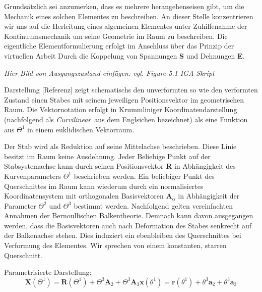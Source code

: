 \documentclass[german,a4paper,12pt,oneside]{scrbook}
\theoremstyle{definition}
\theoremstyle{definition}
\theoremstyle{definition}
\theoremstyle{definition}
\theoremstyle{definition}
\theoremstyle{definition}
\begin{document}
Grundsätzlich sei anzumerken, dass es  mehrere herangehenseisen gibt, um die Mechanik eines solchen Elementes zu beschreiben. An dieser Stelle konzentrieren wir uns auf die Herleitung eines algemeinen Elementes unter Zuhilfenahme der Kontinuumsmechanik um seine Geometrie im Raum zu beschreiben. Die eigentliche Elementformulierung erfolgt im Anschluss über das Prinzip der virtuellen Arbeit Durch die Koppelung von Spannungen \textbf{S} und Dehnungen \textbf{E}. 

\LARGE %
\emph{Hier Bild von Ausgangszustand einfügen: vgl. Figure 5.1 IGA Skript}

\normalsize
Darstellung [Referenz] zeigt schematischs den unverformten so wie den verformten Zustand einen Stabes mit seinem jeweiligen Positionsvektor im geometrischen Raum. Die Vektornotation erfolgt in Krummliniger Koordinatendarstellung (nachfolgend als \glqq\emph{Curvilinear}\grqq ~aus dem Englsichen bezeichnet) als eine Funktion aus $\Theta^1$ in einem euklidischen Vektorraum.

Der Stab wird als Reduktion auf seine Mittelachse beschrieben. Diese Linie besitzt im Raum keine Ausdehnung. Jeder Beliebige Punkt auf der Stabsystemachse kann durch seinen Positionsvektor \textbf{R} in Abhängigkeit des Kurvenparameters $\Theta^1$ beschrieben werden. Ein beliebiger Punkt des Querschnittes im Raum kann wiederum durch ein normalisiertes Koordinatensystem mit orthogonalen Basisvektoren \textbf{A}$_{\alpha}$ in Abhängigkeit der Parameter $\Theta^2$ und $\Theta^3$ bestimmt werden. Nachfolgend gelten vereinfachten Annahmen der Bernoullischen Balkentheorie. Demnach kann davon ausgegangen werden, dass die Basisvektoren auch nach Deformation des Stabes senkrecht auf der Balkenachse stehen. Dies induziert ein ebenbleiben des Querschnittes bei Verformung des Elementes. Wir sprechen von einem konstanten, starren Querschnitt.

\vspace{1.0cm}
Parametrisierte Darstellung:
\begin{subequations}
    \begin{equation} \label{Positionsvektor_a}
        \bm{X}(\Theta^1) = \bm{R}(\Theta^1) + \Theta^3\bm{A}_2 + \Theta^3\bm{A}_3 
    \end{equation}
    \begin{equation} \label{Positionsvektor_b}
        \bm{x}(\theta^1) = \bm{r}(\theta^1) + \theta^3\bm{a}_2 + \theta^3\bm{a}_3  
    \end{equation}
\end{subequations}
\end{document}
